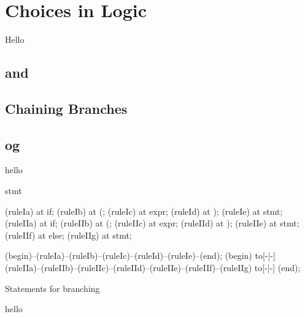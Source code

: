 \section{Choices in Logic}
\label{sec:flow:branch}

Hello

\subsection{ and }
\subsection{}
\subsection{Chaining Branches}
\subsection{ og }

\csharpsubsection{\csharp}
hello

\begin{syntaxfloat}
  \begin{syntax}{stmt}
    
    \node[terminal]    (ruleIa)  at  {if};
    \node[terminal]    (ruleIb)  at  {(};
    \node[nonterminal] (ruleIc)  at  {expr};
    \node[terminal]    (ruleId)  at  {)};
    \node[nonterminal] (ruleIe)  at  {stmt};
    \node[terminal]    (ruleIIa) at  {if};
    \node[terminal]    (ruleIIb) at  {(};
    \node[nonterminal] (ruleIIc) at  {expr};
    \node[terminal]    (ruleIId) at  {)};
    \node[nonterminal] (ruleIIe) at  {stmt};
    \node[terminal]    (ruleIIf) at  {else};
    \node[nonterminal] (ruleIIg) at  {stmt};
    
    \draw[path] (begin)--(ruleIa)--(ruleIb)--(ruleIc)--(ruleId)--(ruleIe)--(end);
    \draw[path] (begin) to[-|-] (ruleIIa)--(ruleIIb)--(ruleIIc)--(ruleIId)--(ruleIIe)--(ruleIIf)--(ruleIIg) to[-|-] (end);
  \end{syntax}
  \caption{Statements for branching}
\end{syntaxfloat}

hello
